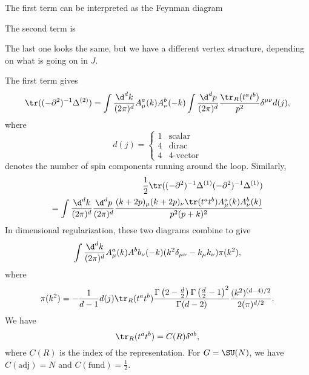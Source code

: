 \documentclass[a4paper]{article}
\begin{document}
The first term can be interpreted as the Feynman diagram
\begin{center}
\end{center}
The second term is
\begin{center}
\end{center}
The last one looks the same, but we have a different vertex structure, depending on what is going on in $J$.

The first term gives
\[
  \tr ((-\partial^2)^{-1} \Delta^{(2)}) = \int \frac{\d^d k}{(2\pi)^d} A_\mu^a(k) A_\nu^b(-k) \int \frac{\d^d p}{(2\pi)^d} \frac{\tr_R(t^a t^b)}{p^2} \delta^{\mu\nu} d(j),
\]
where
\[
  d(j) =
  \begin{cases}
    1 & \mathrm{scalar}\\
    4 & \mathrm{dirac}\\
    4 & \text{4-vector}
  \end{cases}
\]
denotes the number of spin components running around the loop. Similarly,
\begin{align*}
  \frac{1}{2} \tr ((-\partial^2)^{-1} \Delta^{(1)} (-\partial^2)^{-1} \Delta^{(1)}) \\
  = \int \frac{\d^d k}{(2\pi)^d} \frac{\d^d p}{(2\pi)^d} \frac{(k + 2p)_\mu (k + 2p)_\nu\tr(t^a t^b) A_\mu^a(k) A_\nu^b(k)}{p^2 (p + k)^2}
\end{align*}
In dimensional regularization, these two diagrams combine to give
\[
  \int\frac{\d^d k}{(2\pi)^d} A^a_\mu(k) A^bb_\nu(-k) (k^2 \delta_{\mu\nu} - k_\mu k_\nu) \pi(k^2),
\]
where
\[ %
  \pi(k^2) = - \frac{1}{d - 1} d(j) \tr_R (t^a t^b) \frac{\Gamma\left(2 - \frac{d}{2}\right) \Gamma\left(\frac{d}{2} - 1\right)^2}{\Gamma(d - 2)} \frac{(k^2)^{(d - 4)/2}}{2(\pi)^{d/2}}.
\]
We have
\[
  \tr_R (t^a t^b) = C(R) \delta^{ab},
\]
where $C(R)$ is the index of the representation. For $G = \SU(N)$, we have $C(\mathrm{adj}) = N$ and $C(\mathrm{fund}) = \frac{1}{2}$.
\end{document}
